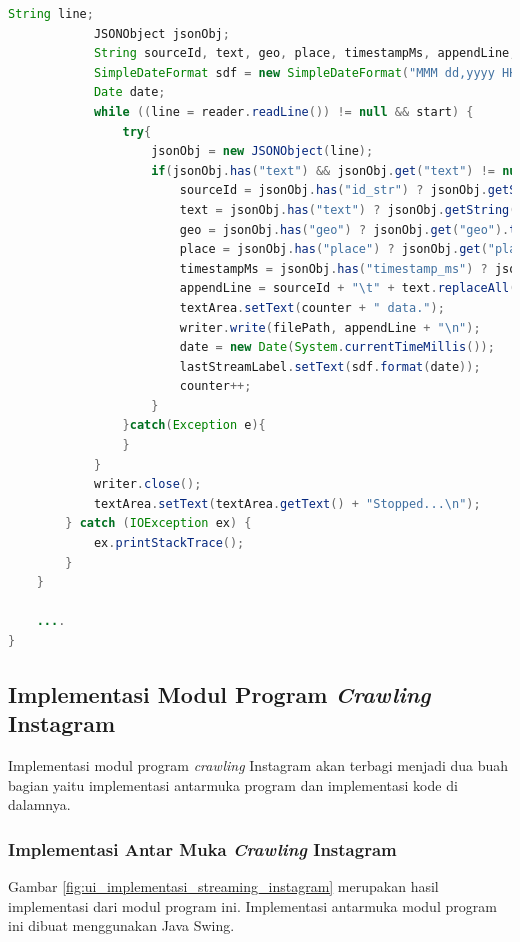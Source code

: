\begin{lstlisting}[language=Java,basicstyle=\tiny,caption=TwitterStreamer.java,label={lst:kode_twitter_streamer}]
            String line;
            JSONObject jsonObj;
            String sourceId, text, geo, place, timestampMs, appendLine;
            SimpleDateFormat sdf = new SimpleDateFormat("MMM dd,yyyy HH:mm:ss");    
            Date date;
            while ((line = reader.readLine()) != null && start) {
                try{
                    jsonObj = new JSONObject(line);
                    if(jsonObj.has("text") && jsonObj.get("text") != null){
                        sourceId = jsonObj.has("id_str") ? jsonObj.getString("id_str") : null;
                        text = jsonObj.has("text") ? jsonObj.getString("text") : null;
                        geo = jsonObj.has("geo") ? jsonObj.get("geo").toString() : null;
                        place = jsonObj.has("place") ? jsonObj.get("place").toString() : null;
                        timestampMs = jsonObj.has("timestamp_ms") ? jsonObj.getString("timestamp_ms") : null;
                        appendLine = sourceId + "\t" + text.replaceAll("\\n", " ") + "\t" + geo + "\t" + place + "\t" + timestampMs + "\t";
                        textArea.setText(counter + " data.");
                        writer.write(filePath, appendLine + "\n");
                        date = new Date(System.currentTimeMillis());
                        lastStreamLabel.setText(sdf.format(date));
                        counter++;
                    }
                }catch(Exception e){
                }
            }
            writer.close();
            textArea.setText(textArea.getText() + "Stopped...\n");
        } catch (IOException ex) {
            ex.printStackTrace();
        }
    }
    
    ....
}
\end{lstlisting}

\subsection{Implementasi Modul Program \textit{Crawling} Instagram}
Implementasi modul program \textit{crawling} Instagram akan terbagi menjadi dua buah bagian yaitu implementasi antarmuka program dan implementasi kode di dalamnya. 

\subsubsection{Implementasi Antar Muka \textit{Crawling} Instagram}
Gambar \ref{fig:ui_implementasi_streaming_instagram} merupakan hasil implementasi dari modul program ini. Implementasi antarmuka modul program ini dibuat menggunakan Java Swing. 

